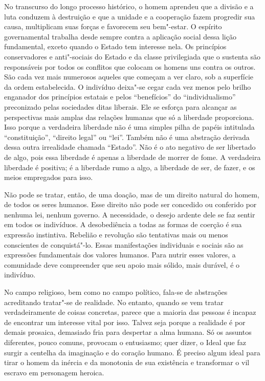 No transcurso do longo processo histórico, o homem aprendeu que a
divisão e a luta conduzem à destruição e que a unidade e a cooperação
fazem progredir sua causa, multiplicam suas forças e favorecem seu
bem"-estar. O espírito governamental trabalha desde sempre contra a
aplicação social dessa lição fundamental, exceto quando o Estado tem
interesse nela. Os princípios conservadores e anti"-sociais do Estado
e da classe privilegiada que o sustenta são responsáveis por todos os
conflitos que colocam os homens uns contra os outros. São cada vez mais
numerosos aqueles que começam a ver claro, sob a superfície da ordem
estabelecida. O indivíduo deixa"-se cegar cada vez menos pelo brilho enganador
dos princípios estatais e pelos “benefícios” do “individualismo”
preconizado pelas sociedades ditas liberais. Ele se esforça para
alcançar as perspectivas mais amplas das relações humanas que só a
liberdade proporciona. Isso porque a verdadeira liberdade não é uma
simples pilha de papéis intitulada “constituição”, “direito legal” ou
“lei”. Também não é uma abstração derivada dessa outra irrealidade
chamada “Estado”. Não é o ato negativo de ser libertado de algo, pois
essa liberdade é apenas a liberdade de morrer de fome. A verdadeira
liberdade é positiva; é a liberdade rumo a algo, a liberdade de ser, de
fazer, e os meios empregados para isso.

Não pode se tratar, então, de uma doação, mas de um direito natural do
homem, de todos os seres humanos. Esse direito não pode ser concedido
ou conferido por nenhuma lei, nenhum governo. A necessidade, o desejo
ardente dele se faz sentir em todos os indivíduos. A desobediência a
todas as formas de coerção é sua expressão instintiva. Rebelião e
revolução são tentativas mais ou menos conscientes de conquistá"-lo.
Essas manifestações individuais e sociais são as expressões
fundamentais dos valores humanos. Para nutrir esses valores, a
comunidade deve compreender que seu apoio mais sólido, mais durável, é
o indivíduo.

No campo religioso, bem como no campo político, fala-se de abstrações
acreditando tratar"-se de realidade. No entanto, quando se vem tratar
verdadeiramente de coisas concretas, parece que a maioria das pessoas é
incapaz de encontrar um interesse vital por isso. Talvez seja porque a
realidade é por demais prosaica, demasiado fria para despertar a 
alma humana. Só os assuntos diferentes, pouco comuns, provocam o
entusiasmo; quer dizer, o Ideal que faz surgir a centelha da imaginação
e do coração humano. É preciso algum ideal para tirar o homem da
inércia e da monotonia de sua existência e transformar o vil escravo em
personagem heroica.

